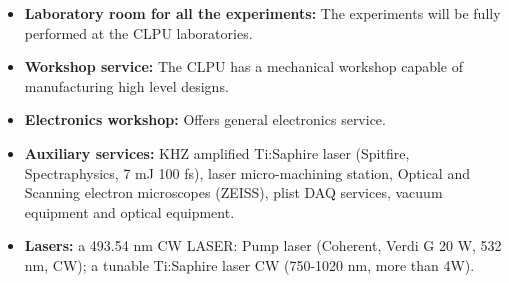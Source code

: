  \begin{itemize}
    \item \textbf{Laboratory room for all the experiments:} The experiments will be fully performed at the CLPU laboratories.
    
\item \textbf{Workshop service:} The CLPU has a mechanical workshop capable of manufacturing high level designs. 

\item \textbf{Electronics workshop:} Offers general electronics service. 

\item \textbf{Auxiliary services:} KHZ amplified Ti:Saphire laser (Spitfire, Spectraphysics, 7 mJ 100 fs), laser micro-machining station, Optical and Scanning electron microscopes (ZEISS), plist DAQ services, vacuum equipment and optical equipment.   

%
%
%

\item \textbf{Lasers:} a 493.54 nm CW LASER: Pump laser (Coherent, Verdi G 20 W, 532 nm, CW); a tunable Ti:Saphire laser CW (750-1020 nm,  more than 4W).
%
%

\end{itemize}


